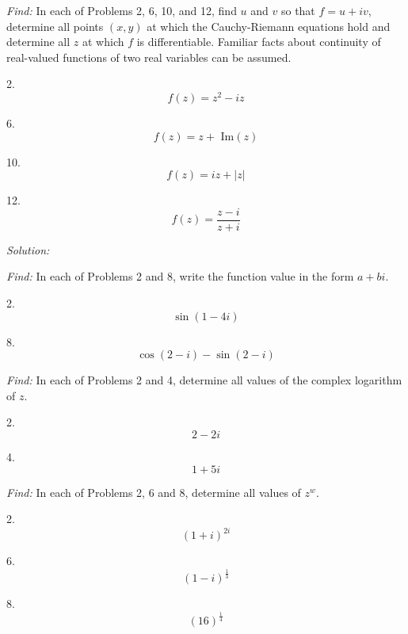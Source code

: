 \documentclass[11pt]{homework}
\begin{document}
\maketitle

\emph{Find:}
\newline
In each of Problems 2, 6, 10, and 12, 
find $u$ and $v$ so that 
$f=u+iv$, determine all points $(x,y)$
at which the Cauchy-Riemann 
equations hold and determine all 
$z$ at which $f$ is differentiable.
Familiar facts about continuity of 
real-valued functions of two real variables
can be assumed. 

2. 
\begin{equation*}
  f(z) = z^2 - iz
\end{equation*}

6. 
\begin{equation*}
  f(z) = z + \text{ Im}(z)
\end{equation*}

10.
\begin{equation*}
  f(z) = iz + |z|
\end{equation*}

12.
\begin{equation*}
  f(z) = \frac{z-i}{z+i}
\end{equation*}

\emph{Solution:}
\newline


\emph{Find:}
\newline
In each of Problems 2 and 8,
write the function value in the form
$a+bi$.

2.
\begin{equation*}
  \sin (1-4i)
\end{equation*}

8.
\begin{equation*}
  \cos (2-i) - \sin ( 2-i)
\end{equation*}

\emph{Find:}
In each of Problems 2 and 4,
determine all values of the 
complex logarithm of $z$.

2. 
\begin{equation*}
  2 - 2i
\end{equation*}

4. 
\begin{equation*}
  1 + 5i
\end{equation*}

\emph{Find:}
In each of Problems 2, 6 and 8,
determine all values of $z^w$.

2.
\begin{equation*}
  (1+i)^{2i}
\end{equation*}

6.
\begin{equation*}
  (1-i)^{\frac{1}{3}}
\end{equation*}

8.
\begin{equation*}
  (16)^{\frac{1}{4}}
\end{equation*}
\end{document}
